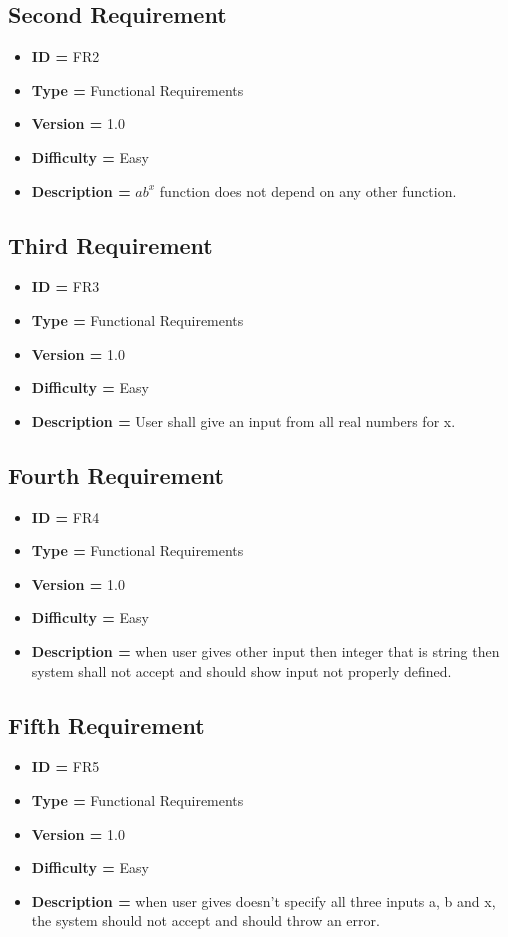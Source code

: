 \documentclass[a4paper, 11pt]{article}
\begin{document}
    \subsection*{Second Requirement}
    \begin{itemize}
        \item \textbf{ID = } FR2
        \item \textbf{Type = } Functional Requirements
        \item \textbf{Version = } 1.0
        \item \textbf{Difficulty = } Easy
        \item \textbf{Description = } $ab^x$ function does not depend on any other function.\\
    \end{itemize}
    \subsection*{Third Requirement}
    \begin{itemize}
        \item \textbf{ID = } FR3
        \item \textbf{Type = } Functional Requirements
        \item \textbf{Version = } 1.0
        \item \textbf{Difficulty = } Easy
        \item \textbf{Description = }  User shall give an input from all real numbers for x.  
    \end{itemize}
    \subsection*{Fourth  Requirement}
    \begin{itemize}
        \item \textbf{ID = } FR4
        \item \textbf{Type = } Functional Requirements
        \item \textbf{Version = } 1.0
        \item \textbf{Difficulty = } Easy
        \item \textbf{Description = }when user gives other input then integer that is string then system shall not accept and should show input not properly defined.  
    \end{itemize}
        \subsection*{Fifth  Requirement}
    \begin{itemize}
        \item \textbf{ID = } FR5
        \item \textbf{Type = } Functional Requirements
        \item \textbf{Version = } 1.0
        \item \textbf{Difficulty = } Easy
        \item \textbf{Description = }when user gives doesn't specify all three inputs a, b and x, the system should not accept and should throw an error.
    \end{itemize}
\end{document}
